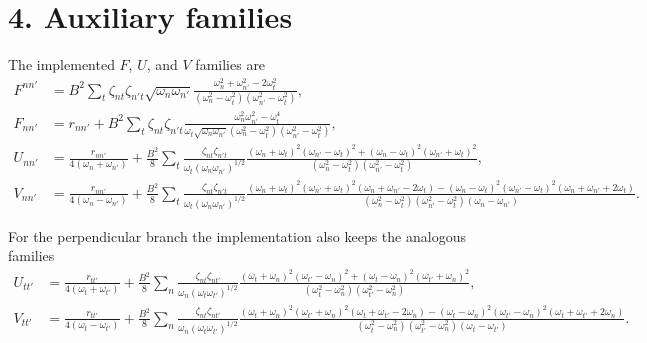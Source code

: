 \documentclass[11pt]{article}
\begin{document}
\section*{4. Auxiliary families}

The implemented $F$, $U$, and $V$ families are
\begin{align}
F^{nn'} &=
B^2\sum_t \zeta_{nt}\zeta_{n't}\sqrt{\omega_n\omega_{n'}}
\frac{\omega_n^2+\omega_{n'}^2-2\omega_t^2}
{(\omega_n^2-\omega_t^2)(\omega_{n'}^2-\omega_t^2)},
\\[0.6em]
F_{nn'} &=
r_{nn'}
+ B^2\sum_t \zeta_{nt}\zeta_{n't}
\frac{\omega_n^2\omega_{n'}^2-\omega_t^4}
{\omega_t\sqrt{\omega_n\omega_{n'}}(\omega_n^2-\omega_t^2)(\omega_{n'}^2-\omega_t^2)},
\\[0.6em]
U_{nn'} &=
\frac{r_{nn'}}{4(\omega_n+\omega_{n'})}
+ \frac{B^2}{8}\sum_t
\frac{\zeta_{nt}\zeta_{n't}}
{\omega_t(\omega_n\omega_{n'})^{1/2}}
\frac{(\omega_n+\omega_t)^2(\omega_{n'}-\omega_t)^2+(\omega_n-\omega_t)^2(\omega_{n'}+\omega_t)^2}
{(\omega_n^2-\omega_t^2)(\omega_{n'}^2-\omega_t^2)},
\\[0.6em]
V_{nn'} &=
\frac{r_{nn'}}{4(\omega_n-\omega_{n'})}
+ \frac{B^2}{8}\sum_t
\frac{\zeta_{nt}\zeta_{n't}}
{\omega_t(\omega_n\omega_{n'})^{1/2}}
\frac{
(\omega_n+\omega_t)^2(\omega_{n'}+\omega_t)^2(\omega_n+\omega_{n'}-2\omega_t)
-
(\omega_n-\omega_t)^2(\omega_{n'}-\omega_t)^2(\omega_n+\omega_{n'}+2\omega_t)
}
{(\omega_n^2-\omega_t^2)(\omega_{n'}^2-\omega_t^2)(\omega_n-\omega_{n'})}.
\end{align}

For the perpendicular branch the implementation also keeps the analogous
families
\begin{align}
U_{tt'} &=
\frac{r_{tt'}}{4(\omega_t+\omega_{t'})}
+ \frac{B^2}{8}\sum_n
\frac{\zeta_{nt}\zeta_{nt'}}
{\omega_n(\omega_t\omega_{t'})^{1/2}}
\frac{(\omega_t+\omega_n)^2(\omega_{t'}-\omega_n)^2+(\omega_t-\omega_n)^2(\omega_{t'}+\omega_n)^2}
{(\omega_t^2-\omega_n^2)(\omega_{t'}^2-\omega_n^2)},
\\[0.6em]
V_{tt'} &=
\frac{r_{tt'}}{4(\omega_t-\omega_{t'})}
+ \frac{B^2}{8}\sum_n
\frac{\zeta_{nt}\zeta_{nt'}}
{\omega_n(\omega_t\omega_{t'})^{1/2}}
\frac{
(\omega_t+\omega_n)^2(\omega_{t'}+\omega_n)^2(\omega_t+\omega_{t'}-2\omega_n)
-
(\omega_t-\omega_n)^2(\omega_{t'}-\omega_n)^2(\omega_t+\omega_{t'}+2\omega_n)
}
{(\omega_t^2-\omega_n^2)(\omega_{t'}^2-\omega_n^2)(\omega_t-\omega_{t'})}.
\end{align}
\end{document}
